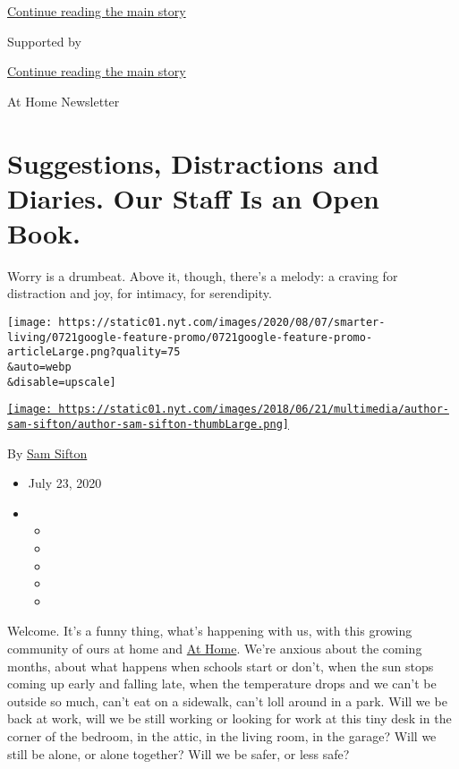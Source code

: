 \protect\hyperlink{after-top}{Continue reading the main story}

Supported by

\protect\hyperlink{after-sponsor}{Continue reading the main story}

At Home Newsletter

\hypertarget{suggestions-distractions-and-diaries-our-staff-is-an-open-book}{%
\section{Suggestions, Distractions and Diaries. Our Staff Is an Open
Book.}\label{suggestions-distractions-and-diaries-our-staff-is-an-open-book}}

Worry is a drumbeat. Above it, though, there's a melody: a craving for
distraction and joy, for intimacy, for serendipity.

\texttt{[image: https://static01.nyt.com/images/2020/08/07/smarter-living/0721google-feature-promo/0721google-feature-promo-articleLarge.png?quality=75\\\&auto=webp\\\&disable=upscale]}

\href{https://www.nytimes.com/by/sam-sifton}{\texttt{[image: https://static01.nyt.com/images/2018/06/21/multimedia/author-sam-sifton/author-sam-sifton-thumbLarge.png]}}

By \href{https://www.nytimes.com/by/sam-sifton}{Sam Sifton}

\begin{itemize}
\item
  July 23, 2020
\item
  \begin{itemize}
  \item
  \item
  \item
  \item
  \item
  \end{itemize}
\end{itemize}

Welcome. It's a funny thing, what's happening with us, with this growing
community of ours at home and \href{http://www.nytimes.com/athome}{At
Home}. We're anxious about the coming months, about what happens when
schools start or don't, when the sun stops coming up early and falling
late, when the temperature drops and we can't be outside so much, can't
eat on a sidewalk, can't loll around in a park. Will we be back at work,
will we be still working or looking for work at this tiny desk in the
corner of the bedroom, in the attic, in the living room, in the garage?
Will we still be alone, or alone together? Will we be safer, or less
safe?


